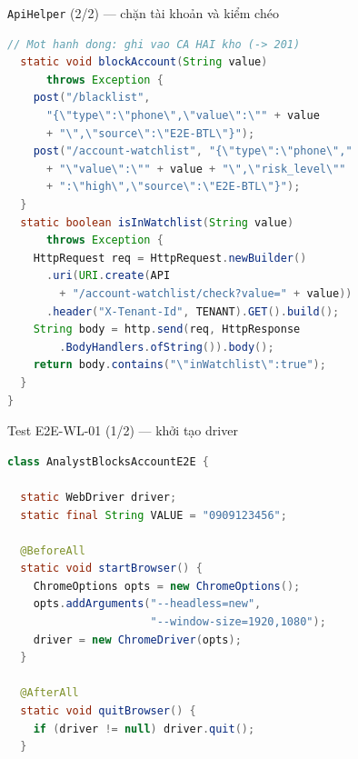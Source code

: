 \documentclass[aspectratio=169,12pt]{beamer}
\begin{document}
\begin{frame}[fragile]{\texttt{ApiHelper} (2/2) --- chặn tài khoản và kiểm chéo}
  \vspace*{-0.7em}
\begin{lstlisting}[language=Java,basicstyle=\ttfamily\scriptsize]
  // Mot hanh dong: ghi vao CA HAI kho (-> 201)
  static void blockAccount(String value)
      throws Exception {
    post("/blacklist",
      "{\"type\":\"phone\",\"value\":\"" + value
      + "\",\"source\":\"E2E-BTL\"}");
    post("/account-watchlist", "{\"type\":\"phone\","
      + "\"value\":\"" + value + "\",\"risk_level\""
      + ":\"high\",\"source\":\"E2E-BTL\"}");
  }
  static boolean isInWatchlist(String value)
      throws Exception {
    HttpRequest req = HttpRequest.newBuilder()
      .uri(URI.create(API
        + "/account-watchlist/check?value=" + value))
      .header("X-Tenant-Id", TENANT).GET().build();
    String body = http.send(req, HttpResponse
        .BodyHandlers.ofString()).body();
    return body.contains("\"inWatchlist\":true");
  }
}
\end{lstlisting}
\end{frame}

\begin{frame}[fragile]{Test E2E-WL-01 (1/2) --- khởi tạo driver}
\begin{lstlisting}[language=Java,basicstyle=\ttfamily\scriptsize]
class AnalystBlocksAccountE2E {

  static WebDriver driver;
  static final String VALUE = "0909123456";

  @BeforeAll
  static void startBrowser() {
    ChromeOptions opts = new ChromeOptions();
    opts.addArguments("--headless=new",
                      "--window-size=1920,1080");
    driver = new ChromeDriver(opts);
  }

  @AfterAll
  static void quitBrowser() {
    if (driver != null) driver.quit();
  }
\end{lstlisting}
\end{frame}
\end{document}
